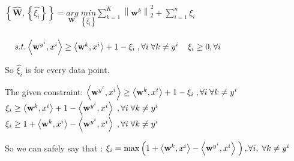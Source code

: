 \documentclass[a4paper,11pt]{article}
\begin{document}
\begin{mlsolution}

\begin{math}
\left \{ \widehat{\textbf{W}}, \left \{ \widehat{\xi _{i}} \right \} \right \} = \underset{\textbf{W},}{arg} \; \underset{ \left \{ \widehat{\xi _{i}} \right \}}{min} \sum_{k=1}^{K} \left \| \textbf{w}^{k} \right \|^{2}_{2} + \sum_{i=1}^{n} \xi _{i}\end{math}\\\\

\begin{math}
\;\;\;\;s.t. \left \langle \textbf{w}^{y^{i}}, x^{i} \right \rangle \geq \left \langle \textbf{w}^{k}, x^{i} \right \rangle + 1 - \xi_{i}\; , \forall i\; \forall k\neq y^{i} \\
\; \; \; \; \xi_{i} \geq 0, \forall i
\end{math}

So \begin{math}\widehat{\xi _{i}}\end{math} is for every data point.

The given constraint: \; \; \begin{math} \left \langle \textbf{w}^{y^{i}}, x^{i} \right \rangle \geq \left \langle \textbf{w}^{k}, x^{i} \right \rangle + 1 - \xi_{i}\; , \forall i\; \forall k\neq y^{i} \\ \end{math} \\

\begin{math} \xi_{i} \geq \left \langle \textbf{w}^{k}, x^{i} \right \rangle + 1 - \left \langle \textbf{w}^{y^{i}}, x^{i} \right \rangle \; , \forall i\; \forall k\neq y^{i} \\ \end{math} \\

\begin{math}
\xi_{i} \geq 1 + \left \langle \textbf{w}^{k}, x^{i} \right \rangle - \left \langle \textbf{w}^{y^{i}}, x^{i} \right \rangle \; , \forall i\; \forall k\neq y^{i} \\
\end{math}

So we can safely say that :
\begin{math}
\xi_{i} = \max\left (   1 + \left \langle \textbf{w}^{k}, x^{i} \right \rangle - \left \langle \textbf{w}^{y^{i}}, x^{i} \right \rangle \; \right ), \forall i,\; \forall k\neq y^{i} \\
\end{math}


\end{mlsolution}
\end{document}
